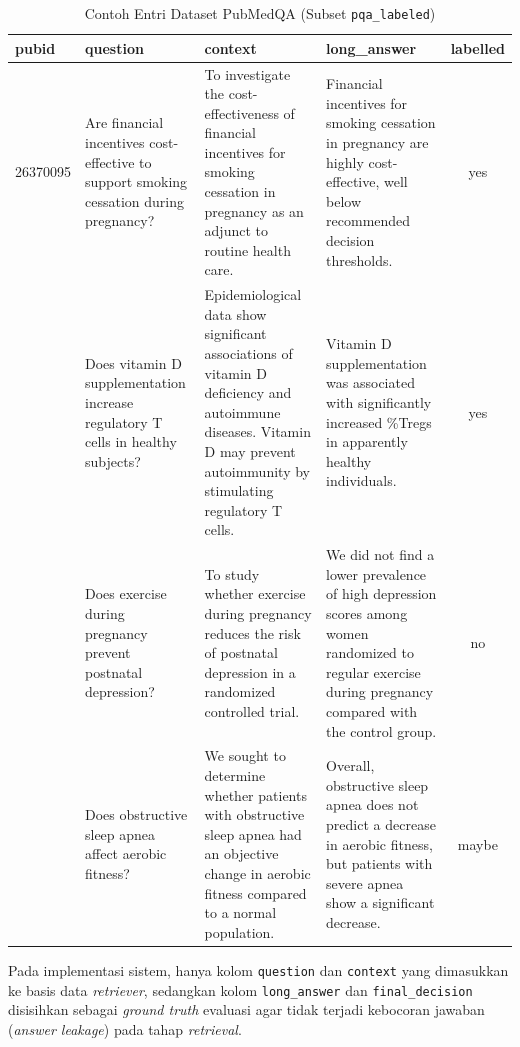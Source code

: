 \begin{table}[H]
\centering
\footnotesize
\setlength{\tabcolsep}{4pt}
\caption{Contoh Entri Dataset PubMedQA (Subset \texttt{pqa\_labeled})}
\label{tbl:pubmedqa-sample}
\begin{tabular}{l p{3.3cm} p{3.3cm} p{3.3cm} c}
\toprule
\textbf{pubid} & \textbf{question} & \textbf{context} & \textbf{long\_answer} & \textbf{labelled} \\
\midrule
26370095 & Are financial incentives cost-effective to support smoking cessation during pregnancy? & To investigate the cost-effectiveness of financial incentives for smoking cessation in pregnancy as an adjunct to routine health care. & Financial incentives for smoking cessation in pregnancy are highly cost-effective, well below recommended decision thresholds. & yes \\
\addlinespace
20684175 & Does vitamin D supplementation increase regulatory T cells in healthy subjects? & Epidemiological data show significant associations of vitamin D deficiency and autoimmune diseases. Vitamin D may prevent autoimmunity by stimulating regulatory T cells. & Vitamin D supplementation was associated with significantly increased \%Tregs in apparently healthy individuals. & yes \\
\addlinespace
21880023 & Does exercise during pregnancy prevent postnatal depression? & To study whether exercise during pregnancy reduces the risk of postnatal depression in a randomized controlled trial. & We did not find a lower prevalence of high depression scores among women randomized to regular exercise during pregnancy compared with the control group. & no \\
\addlinespace
17076091 & Does obstructive sleep apnea affect aerobic fitness? & We sought to determine whether patients with obstructive sleep apnea had an objective change in aerobic fitness compared to a normal population. & Overall, obstructive sleep apnea does not predict a decrease in aerobic fitness, but patients with severe apnea show a significant decrease. & maybe \\
\bottomrule
\end{tabular}
\end{table}

Pada implementasi sistem, hanya kolom \texttt{question} dan \texttt{context} yang dimasukkan ke basis data \textit{retriever}, sedangkan kolom \texttt{long\_answer} dan \texttt{final\_decision} disisihkan sebagai \textit{ground truth} evaluasi agar tidak terjadi kebocoran jawaban (\textit{answer leakage}) pada tahap \textit{retrieval}.

